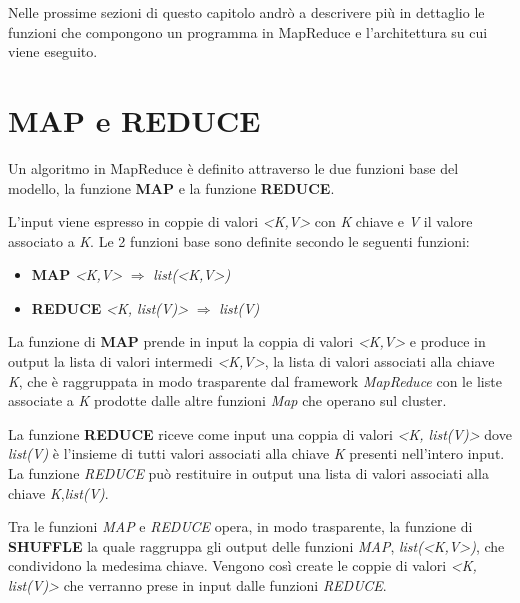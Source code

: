 \documentclass[LaM,binding=0.6cm]{sapthesis}
\begin{document}
Nelle prossime sezioni di questo capitolo andrò a descrivere più in dettaglio le funzioni che compongono un programma in MapReduce e l'architettura su cui viene eseguito. %

\section{MAP e REDUCE}

Un algoritmo in MapReduce \cite{Dean:2008:MSD:1327452.1327492} è definito attraverso le due funzioni base del modello, la funzione \textbf{MAP} e la funzione \textbf{REDUCE}. 


L'input viene espresso in coppie  di valori \textit{<K,V>} con \textit{K} chiave e \textit{V} il valore associato a \textit{K}.	
Le 2 funzioni base sono definite secondo le seguenti funzioni:
\begin{itemize}
\item \textbf{MAP }	\textit{<K,V>} $\Rightarrow$ \textit{list(<K,V>)}
\item\textbf{REDUCE}	\textit{<K, list(V)>} $\Rightarrow$ \textit{list(V)}
\end{itemize}

La funzione di \textbf{MAP} prende in input la coppia di valori \textit{<K,V>} e produce in output la lista di valori intermedi \textit{<K,V>}, la lista di valori associati alla chiave \textit{K}, che è raggruppata in modo trasparente dal framework \textit{MapReduce} con le liste associate a \textit{K} prodotte dalle altre funzioni \textit{Map} che operano sul cluster.
 
La funzione \textbf{REDUCE} riceve come input una coppia di valori \textit{<K,  list(V)>} dove \textit{list(V)} è l'insieme di tutti valori  associati alla chiave \textit{K} presenti nell'intero input.
La funzione \textit{REDUCE} può restituire in output una lista di valori associati alla chiave \textit{K},\textit{list(V)}.

Tra le funzioni \textit{MAP} e \textit{REDUCE} opera, in modo trasparente, la funzione di \textbf{SHUFFLE} la quale raggruppa gli output delle funzioni \textit{MAP}, \textit{list(<K,V>)},  che condividono la medesima chiave. Vengono così create le coppie di valori \textit{<K, list(V)>} che verranno prese in input dalle funzioni \textit{REDUCE}.
\end{document}
